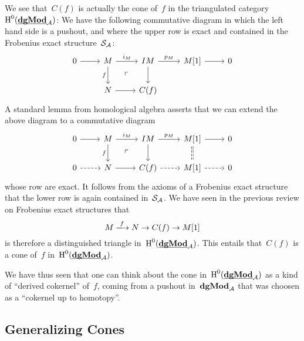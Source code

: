 \documentclass[a4paper,10pt]{scrartcl}
\begin{document}
We see that~$C(f)$ is actually the cone of~$f$ in the triangulated category~$\operatorname{H}^0(\underline{\smash{\mathbf{dgMod}}}_{\mathcal{A}})$:
We have the following commutative diagram in which the left hand side is a pushout, and where the upper row is exact and contained in the Frobenius exact structure~$\mathcal{S}_{\mathcal{A}}$:
\[
  \begin{tikzcd}
    0
    \arrow{r}
    &
    M
    \arrow{r}[above]{i_M}
    \arrow{d}[left]{f}
    \arrow[phantom]{dr}{\ulcorner}
    &
    IM
    \arrow{r}[above]{p_M}
    \arrow{d}
    &
    M[1]
    \arrow{r}
    &
    0
    \\
    {}
    &
    N
    \arrow{r}
    &
    C(f)
    &
    {}
    &
    {}
  \end{tikzcd}
\]
A standard lemma from homological algebra asserts that we can extend the above diagram to a commutative diagram
\[
  \begin{tikzcd}
    0
    \arrow{r}
    &
    M
    \arrow{r}[above]{i_M}
    \arrow{d}[left]{f}
    \arrow[phantom]{dr}{\ulcorner}
    &
    IM
    \arrow{r}[above]{p_M}
    \arrow{d}
    &
    M[1]
    \arrow{r}
    \arrow[dashed,equal]{d}
    &
    0
    \\
    0
    \arrow[dashed]{r}
    &
    N
    \arrow{r}
    &
    C(f)
    \arrow[dashed]{r}
    &
    M[1]
    \arrow[dashed]{r}
    &
    0
  \end{tikzcd}
\]
whose row are exact.
It follows from the axioms of a Frobenius exact structure that the lower row is again contained in~$\mathcal{S}_{\mathcal{A}}$.
We have seen in the previous review on Frobenius exact structures that
\[
  M
  \xlongto{f}
  N
  \to
  C(f)
  \to
  M[1]
\]
is therefore a distinguished triangle in~$\operatorname{H}^0(\underline{\smash{\mathbf{dgMod}}}_{\mathcal{A}})$.
This entails that~$C(f)$ is a cone of~$f$ in~$\operatorname{H}^0(\underline{\smash{\mathbf{dgMod}}}_{\mathcal{A}})$.

We have thus seen that one can think about the cone in~$\operatorname{H}^0(\underline{\smash{\mathbf{dgMod}}}_{\mathcal{A}})$ as a kind of \enquote{derived cokernel} of~$f$, coming from a pushout in~$\mathbf{dgMod}_{\mathcal{A}}$ that was choosen as a \enquote{cokernel up to homotopy}.



\subsection{Generalizing Cones}
\end{document}
